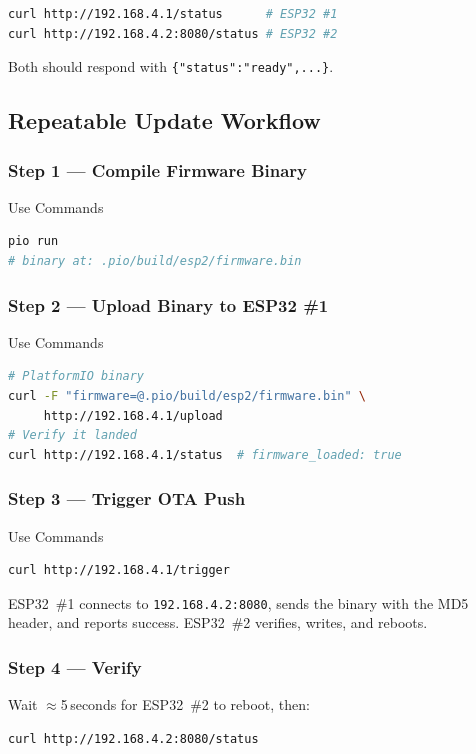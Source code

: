 \documentclass[conference]{IEEEtran}
\begin{document}
\begin{lstlisting}[language=bash, caption={Verify both boards}]
curl http://192.168.4.1/status      # ESP32 #1
curl http://192.168.4.2:8080/status # ESP32 #2
\end{lstlisting}

Both should respond with \texttt{\{"status":"ready",...\}}.

\subsection{Repeatable Update Workflow}

\subsubsection{Step 1 --- Compile Firmware Binary}
Use Commands
\begin{lstlisting}[language=bash, caption={Compile with PlatformIO}]
pio run
# binary at: .pio/build/esp2/firmware.bin
\end{lstlisting}

\subsubsection{Step 2 --- Upload Binary to ESP32 \#1}
Use Commands
\begin{lstlisting}[language=bash, caption={Upload binary to ESP32 \#1}]
# PlatformIO binary
curl -F "firmware=@.pio/build/esp2/firmware.bin" \
     http://192.168.4.1/upload
# Verify it landed
curl http://192.168.4.1/status  # firmware_loaded: true
\end{lstlisting}

\subsubsection{Step 3 --- Trigger OTA Push}
Use Commands
\begin{lstlisting}[language=bash, caption={Trigger OTA push}]
curl http://192.168.4.1/trigger
\end{lstlisting}

ESP32~\#1 connects to \texttt{192.168.4.2:8080}, sends the binary with the
MD5 header, and reports success.
ESP32~\#2 verifies, writes, and reboots.

\subsubsection{Step 4 --- Verify}
Wait $\approx$5\,seconds for ESP32~\#2 to reboot, then:
\begin{lstlisting}[language=bash, caption={Verify ESP32 \#2 is back online}]
curl http://192.168.4.2:8080/status
\end{lstlisting}
\end{document}
